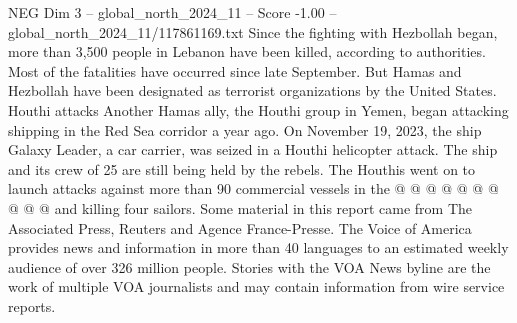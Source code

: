 \begin{textsample}{NEG Dim 3 – global\_north\_2024\_11 – Score -1.00 – global\_north\_2024\_11/117861169.txt}
Since the fighting with Hezbollah began, more than 3,500 people in Lebanon have been killed, according to authorities.
Most of the fatalities have occurred since late September.
But Hamas and Hezbollah have been designated as terrorist organizations by the United States.
Houthi attacks Another Hamas ally, the Houthi group in Yemen, began attacking shipping in the Red Sea corridor a year ago.
On November 19, 2023, the ship Galaxy Leader, a car carrier, was seized in a Houthi helicopter attack.
The ship and its crew of 25 are still being held by the rebels.
The Houthis went on to launch attacks against more than 90 commercial vessels in the @ @ @ @ @ @ @ @ @ @ and killing four sailors.
Some material in this report came from The Associated Press, Reuters and Agence France-Presse.
The Voice of America provides news and information in more than 40 languages to an estimated weekly audience of over 326 million people.
Stories with the VOA News byline are the work of multiple VOA journalists and may contain information from wire service reports.

\end{textsample}
